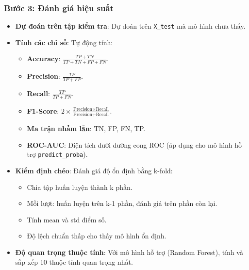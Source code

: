﻿\documentclass{article}
\begin{document}
\subsubsection{Bước 3: Đánh giá hiệu suất}
\begin{itemize}
    \item \textbf{Dự đoán trên tập kiểm tra}: Dự đoán trên \texttt{X\_test} mà mô hình chưa thấy.
    
    \item \textbf{Tính các chỉ số}: Tự động tính:
    \begin{itemize}
        \item \textbf{Accuracy}: $\frac{TP + TN}{TP + TN + FP + FN}$.
        \item \textbf{Precision}: $\frac{TP}{TP + FP}$.
        \item \textbf{Recall}: $\frac{TP}{TP + FN}$.
        \item \textbf{F1-Score}: $2 \times \frac{\text{Precision} \times \text{Recall}}{\text{Precision} + \text{Recall}}$.
        \item \textbf{Ma trận nhầm lẫn}: TN, FP, FN, TP.
        \item \textbf{ROC-AUC}: Diện tích dưới đường cong ROC (áp dụng cho mô hình hỗ trợ \texttt{predict\_proba}).
    \end{itemize}
    
    \item \textbf{Kiểm định chéo}: Đánh giá độ ổn định bằng k-fold:
    \begin{itemize}
        \item Chia tập huấn luyện thành k phần.
        \item Mỗi lượt: huấn luyện trên k-1 phần, đánh giá trên phần còn lại.
        \item Tính mean và std điểm số.
        \item Độ lệch chuẩn thấp cho thấy mô hình ổn định.
    \end{itemize}
    
    \item \textbf{Độ quan trọng thuộc tính}: Với mô hình hỗ trợ (Random Forest), tính và sắp xếp 10 thuộc tính quan trọng nhất.
\end{itemize}
\end{document}
